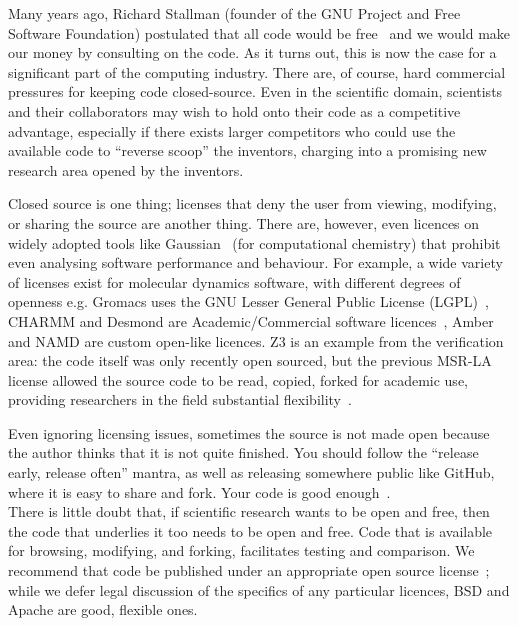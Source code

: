 \documentclass[a4paper,11pt]{article}
\begin{document}
Many years ago, Richard Stallman (founder of the GNU Project and Free
Software Foundation) postulated that all code would be
free~\cite{rms:2010} and we would make our money by consulting on the
code.  As it turns out, this is now the case for a significant
part of the computing industry. There are, of course, hard commercial
pressures for keeping code closed-source. Even in the scientific
domain, scientists and their collaborators may wish to hold onto their
code as a competitive advantage, especially if there exists larger
competitors who could use the available code to ``reverse scoop'' the
inventors, charging into a promising new research area opened by the
inventors.

Closed source is one thing; licenses that deny the user from viewing,
modifying, or sharing the source are another thing. There are,
however, even licences on widely adopted tools like
Gaussian~\cite{Giles2004} (for computational chemistry) that prohibit
even analysing software performance and behaviour. For example, a wide
variety of licenses exist for molecular dynamics software, with
different degrees of openness e.g. Gromacs uses the GNU Lesser General
Public License (LGPL)~\cite{Hess2008}, CHARMM and Desmond are
Academic/Commercial software licences~\cite{Brooks2009,Bowers2006},
Amber and NAMD are custom open-like licences. Z3 is an example from
the verification area: the code itself was only recently open
sourced, but the previous MSR-LA license allowed the source code to be
read, copied, forked for academic use, providing researchers in the
field substantial flexibility~\cite{deMoura2012Z3open}.

Even ignoring licensing issues, sometimes the source is not made open
because the author thinks that it is not quite finished.  You should
follow the ``release early, release often'' mantra, as well as
releasing somewhere public like GitHub, where it is easy to share and
fork. Your code is good enough~\cite{barnes:2010}.
\\
 
 There is little
doubt that, if scientific research wants to be open and free, then the
code that underlies it too needs to be open and free. Code that is
available for browsing, modifying, and forking, facilitates testing
and comparison.  We recommend that code be published under an
appropriate open source license~\cite{osl}; while we defer legal
discussion of the specifics of any particular licences, BSD and Apache
are good, flexible ones.\\
\end{document}

